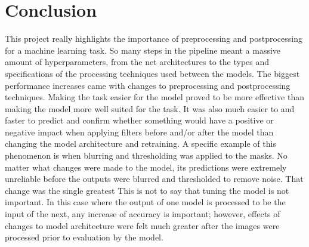 \documentclass[conference]{IEEEtran}
\begin{document}
\section{Conclusion}
This project really highlights the importance of preprocessing and postprocessing for a machine learning task. So many steps in the pipeline meant a massive amount of hyperparameters, from the net architectures to the types and specifications of the processing techniques used between the models. The biggest performance increases came with changes to preprocessing and postprocessing techniques. Making the task easier for the model proved to be more effective than making the model more well suited for the task. It was also much easier to and faster to predict and confirm whether something would have a positive or negative impact when applying filters before and/or after the model than changing the model architecture and retraining. A specific example of this phenomenon is when blurring and thresholding was applied to the masks. No matter what changes were made to the model, its predictions were extremely unreliable before the outputs were blurred and thresholded to remove noise. That change was the single greatest This is not to say that tuning the model is not important. In this case where the output of one model is processed to be the input of the next, any increase of accuracy is important; however, effects of changes to model architecture were felt much greater after the images were processed prior to evaluation by the model.



\end{document}
